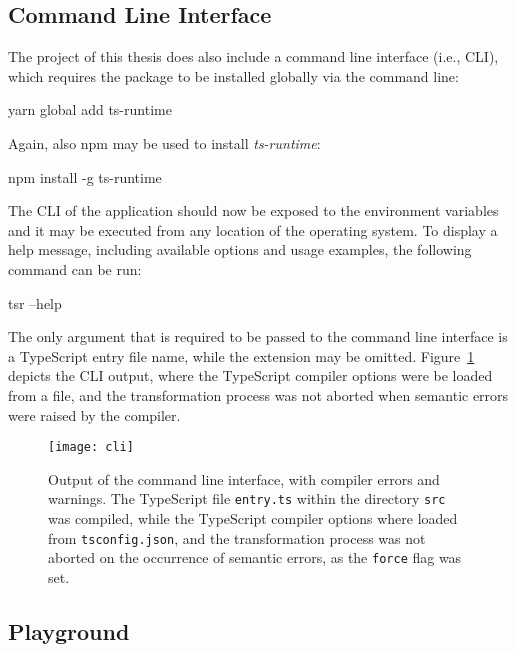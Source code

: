 \subsection{Command Line Interface}
\label{sec:usage-cli}

The project of this thesis does also include a command line interface (i.e., CLI), which requires the package to be installed globally via the command line:
\begin{JsCode}[numbers=none]
yarn global add ts-runtime
\end{JsCode}
Again, also npm may be used to install \emph{ts-runtime}:
\begin{JsCode}[numbers=none]
npm install -g ts-runtime
\end{JsCode}
The CLI of the application should now be exposed to the environment variables and it may be executed from any location of the operating system. To display a help message, including available options and usage examples, the following command can be run:
\begin{JsCode}[numbers=none]
tsr --help
\end{JsCode}
The only argument that is required to be passed to the command line interface is a TypeScript entry file name, while the extension may be omitted. Figure~\ref{fig:cli} depicts the CLI output, where the TypeScript compiler options were be loaded from a file, and the transformation process was not aborted when semantic errors were raised by the compiler.
\begin{figure}
\centering
\texttt{[image: cli]}
\caption{Output of the command line interface, with compiler errors and warnings. The TypeScript file \texttt{entry.ts} within the directory \texttt{src} was compiled, while the TypeScript compiler options where loaded from \texttt{tsconfig.json}, and the transformation process was not aborted on the occurrence of semantic errors, as the \texttt{force} flag was set.}
\label{fig:cli}
\end{figure}

\subsection{Playground}
\label{sec:usage-playground}


